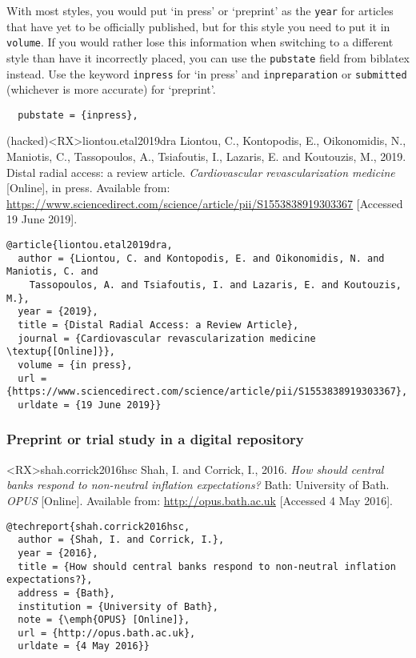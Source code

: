 \documentclass[10pt,a4paper]{article}
\newenvironment{hacks}{%
  \begin{list}{\makebox[2em][c]{\faWrench}}{%
    \setlength{\leftmargin}{2em}
    \setlength{\labelwidth}{2em}
    \setlength{\labelsep}{0pt}}
}{\end{list}}
\begin{document}
\begin{hacks}\item
With most styles, you would put `in press' or `preprint' as the
\texttt{year} for articles that have yet to be officially published, but for
this style you need to put it in \texttt{volume}. If you would rather lose
this information when switching to a different style than have it incorrectly
placed, you can use the \texttt{pubstate} field from \textsf{biblatex}
instead. Use the keyword \texttt{inpress} for `in press' and
\texttt{inpreparation} or \texttt{submitted} (whichever is more accurate) for
`preprint'.

\begin{tcolorbox}%
  [ colframe = Slate
  , colback = white
  , fontupper = \footnotesize
  ]
  \begin{Verbatim}
  pubstate = {inpress},
  \end{Verbatim}
\end{tcolorbox}
\end{hacks}

\begin{bibexbox}(hacked)<RX>{liontou.etal2019dra}
  Liontou, C., Kontopodis, E., Oikonomidis, N., Maniotis, C., Tassopoulos, A., Tsiafoutis, I., Lazaris, E. and Koutouzis, M., 2019. Distal radial access: a review article. \emph{Cardiovascular revascularization medicine} [Online], in press. Available from: \url{https://www.sciencedirect.com/science/article/pii/S1553838919303367} [Accessed 19 June 2019].
  \tcblower
\begin{Verbatim}
@article{liontou.etal2019dra,
  author = {Liontou, C. and Kontopodis, E. and Oikonomidis, N. and Maniotis, C. and
    Tassopoulos, A. and Tsiafoutis, I. and Lazaris, E. and Koutouzis, M.},
  year = {2019},
  title = {Distal Radial Access: a Review Article},
  journal = {Cardiovascular revascularization medicine \textup{[Online]}},
  volume = {in press},
  url = {https://www.sciencedirect.com/science/article/pii/S1553838919303367},
  urldate = {19 June 2019}}
\end{Verbatim}
\end{bibexbox}

\subsubsection*{Preprint or trial study in a digital repository}

\begin{bibexbox}<RX>{shah.corrick2016hsc}
  Shah, I. and Corrick, I., 2016. \emph{How should central banks respond to non-neutral inflation expectations?} Bath: University of Bath. \emph{OPUS} [Online]. Available from: \url{http://opus.bath.ac.uk} [Accessed 4 May 2016].
  \tcblower
\begin{Verbatim}
@techreport{shah.corrick2016hsc,
  author = {Shah, I. and Corrick, I.},
  year = {2016},
  title = {How should central banks respond to non-neutral inflation expectations?},
  address = {Bath},
  institution = {University of Bath},
  note = {\emph{OPUS} [Online]},
  url = {http://opus.bath.ac.uk},
  urldate = {4 May 2016}}
\end{Verbatim}
\end{bibexbox}
\end{document}
